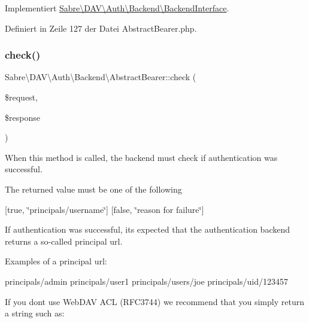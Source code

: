 Implementiert \mbox{\hyperlink{interface_sabre_1_1_d_a_v_1_1_auth_1_1_backend_1_1_backend_interface_a486025eeb4b3b342e7bea4e692a83d94}{Sabre\textbackslash{}\+D\+A\+V\textbackslash{}\+Auth\textbackslash{}\+Backend\textbackslash{}\+Backend\+Interface}}.



Definiert in Zeile 127 der Datei Abstract\+Bearer.\+php.

\mbox{\label{class_sabre_1_1_d_a_v_1_1_auth_1_1_backend_1_1_abstract_bearer_ac43079a9c47779745f3435cb775da867}} 
\subsubsection{\texorpdfstring{check()}{check()}}
{\footnotesize\ttfamily Sabre\textbackslash{}\+D\+A\+V\textbackslash{}\+Auth\textbackslash{}\+Backend\textbackslash{}\+Abstract\+Bearer\+::check (\begin{DoxyParamCaption}\item[{\mbox{\hyperlink{interface_sabre_1_1_h_t_t_p_1_1_request_interface}{Request\+Interface}}}]{\$request,  }\item[{\mbox{\hyperlink{interface_sabre_1_1_h_t_t_p_1_1_response_interface}{Response\+Interface}}}]{\$response }\end{DoxyParamCaption})}

When this method is called, the backend must check if authentication was successful.

The returned value must be one of the following

\mbox{[}true, \char`\"{}principals/username\char`\"{}\mbox{]} \mbox{[}false, \char`\"{}reason for failure\char`\"{}\mbox{]}

If authentication was successful, it\textquotesingle{}s expected that the authentication backend returns a so-\/called principal url.

Examples of a principal url\+:

principals/admin principals/user1 principals/users/joe principals/uid/123457

If you don\textquotesingle{}t use Web\+D\+AV A\+CL (R\+F\+C3744) we recommend that you simply return a string such as\+:

